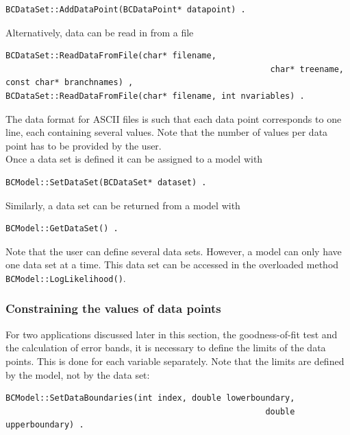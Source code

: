 \documentclass[11pt, a4paper]{article}
\begin{document}
\begin{verbatim} 
BCDataSet::AddDataPoint(BCDataPoint* datapoint) . 
\end{verbatim} 

\noindent 
Alternatively, data can be read in from a file
%
\begin{verbatim}
BCDataSet::ReadDataFromFile(char* filename, 
													  char* treename, const char* branchnames) ,
BCDataSet::ReadDataFromFile(char* filename, int nvariables) .
\end{verbatim} 

\noindent 
The data format for ASCII files is such that each data point
corresponds to one line, each containing several values. Note that the
number of values per data point has to be provided by the user. \\

\noindent 
Once a data set is defined it can be assigned to a model with
%
\begin{verbatim}
BCModel::SetDataSet(BCDataSet* dataset) . 
\end{verbatim} 

\noindent 
Similarly, a data set can be returned from a model with 
%
\begin{verbatim}
BCModel::GetDataSet() . 
\end{verbatim} 

\noindent 
Note that the user can define several data sets. However, a model can
only have one data set at a time. This data set can be accessed in the
overloaded method \verb|BCModel::LogLikelihood()|.


\subsubsection{Constraining the values of data points}

For two applications discussed later in this section, the
goodness-of-fit test and the calculation of error bands, it is
necessary to define the limits of the data points. This is done for
each variable separately. Note that the limits are defined by the
model, not by the data set:
%
\begin{verbatim}
BCModel::SetDataBoundaries(int index, double lowerboundary, 
													 double upperboundary) . 
\end{verbatim}

\end{document}
